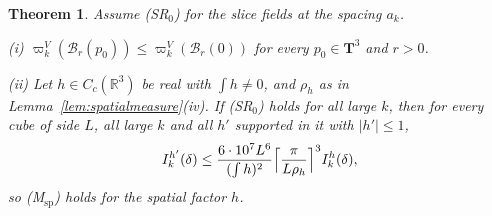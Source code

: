 \documentclass[aps,prd,twocolumn,superscriptaddress,nofootinbib,longbibliography,floatfix,amsmath,amssymb,10pt]{revtex4-2}
\newtheorem{theorem}{Theorem}
\theoremstyle{definition}
\theoremstyle{remark}
\newcommand{\R}{\mathbb{R}}
\begin{document}
\begin{theorem}\label{thm:spatialrp}
Assume \textup{(SR$_0$)} for the slice fields at the spacing $a_k$.

\textup{(i)} $\varpi^V_k(\mathcal B_r(p_0))\le\varpi^V_k(\mathcal B_r(0))$
for every $p_0\in\mathbf T^3$ and $r>0$.

\textup{(ii)} Let $h\in C_c(\R^3)$ be real with $\int h\ne0$, and $\rho_h$
as in Lemma~\textup{\ref{lem:spatialmeasure}(iv)}. If \textup{(SR$_0$)}
holds for all large $k$, then for every cube of side $L$, all large $k$ and
all $h'$ supported in it with $|h'|\le1$,
\[
I^{h'}_k(\delta)\le\frac{6\cdot10^7L^6}{(\int h)^2}\Bigl\lceil\frac\pi
{L\rho_h}\Bigr\rceil^3I^h_k(\delta) ,
\]
so \textup{(M$_{\mathrm{sp}}$)} holds for the spatial factor $h$.
\end{theorem}
\end{document}
